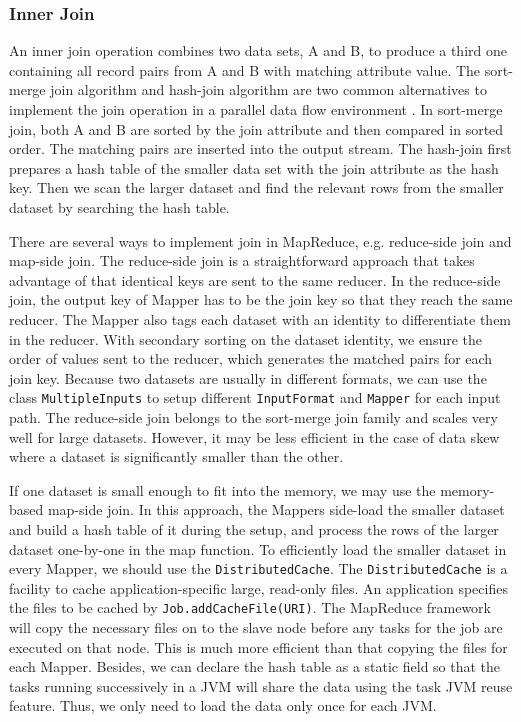 \documentclass[12pt]{book}
\begin{document}
\subsubsection{Inner Join}

An inner join operation combines two data sets, A and B, to produce a third one containing all record pairs from A and B with matching attribute value. The sort-merge join algorithm and hash-join algorithm are two common alternatives to implement the join operation in a parallel data flow environment \cite{DeWitt:1992:PDS}. In sort-merge join, both A and B are sorted by the join attribute and then compared in sorted order. The matching pairs are inserted into the output stream. The hash-join first prepares a hash table of the smaller data set with the join attribute as the hash key. Then we scan the larger dataset and find the relevant rows from the smaller dataset by searching the hash table.

There are several ways to implement join in MapReduce, e.g. reduce-side join and map-side join. The reduce-side join is a straightforward approach that takes advantage of that identical keys are sent to the same reducer. In the reduce-side join, the output key of Mapper has to be the join key so that they reach the same reducer. The Mapper also tags each dataset with an identity to differentiate them in the reducer. With secondary sorting on the dataset identity, we ensure the order of values sent to the reducer, which generates the matched pairs for each join key.
Because two datasets are usually in different formats, we can use the class \texttt{MultipleInputs} to setup different \texttt{InputFormat} and \texttt{Mapper} for each input path. The reduce-side join belongs to the sort-merge join family and scales very well for large datasets. However, it may be less efficient in the case of data skew where a dataset is significantly smaller than the other.

If one dataset is small enough to fit into the memory, we may use the memory-based map-side join. In this approach, the Mappers side-load the smaller dataset and build a hash table of it during the setup, and process the rows of the larger dataset one-by-one in the map function. To efficiently load the smaller dataset in every Mapper, we should use the \texttt{DistributedCache}. The \texttt{DistributedCache} is a facility to cache application-specific large, read-only files. 
An application specifies the files to be cached by \texttt{Job.addCacheFile(URI)}. The MapReduce framework will copy the necessary files on to the slave node before any tasks for the job are executed on that node. This is much more efficient than that copying the files for each Mapper. Besides, we can declare the hash table as a static field so that the
tasks running successively in a JVM will share the data using the task JVM reuse feature. Thus, we only need to load the data only once for each JVM.
\end{document}
